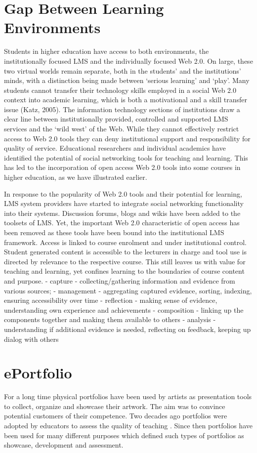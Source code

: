 \section{Gap Between Learning Environments}
Students in higher education have access to both environments, the
institutionally focused LMS and the individually focused Web 2.0. On large,
these two virtual worlds remain separate, both in the students’ and the
institutions’ minds, with a distinction being made between ‘serious learning’
and ‘play’.  Many students cannot transfer their technology skills employed in a
social Web 2.0 context into academic learning, which is both a motivational and
a skill transfer issue (Katz, 2005). The information technology
sections of institutions draw a clear line between institutionally provided, controlled and
supported LMS services and the ‘wild west’ of the Web. While they cannot
effectively restrict access to Web 2.0 tools they can deny institutional support
and responsibility for quality of service. Educational researchers and
individual academics have identified the potential of social networking tools
for teaching and learning. This has led to the incorporation of open access Web
2.0 tools into some courses in higher education, as we have illustrated earlier.

In response to the popularity of Web 2.0 tools and their potential for learning,
LMS system providers have started to integrate social networking functionality
into their systems. Discussion forums, blogs and wikis have been added to the
toolsets of LMS. Yet, the important Web 2.0 characteristic of open access has
been removed as these tools have been bound into the institutional LMS
framework. Access is linked to course enrolment and under institutional control.
Student generated content is accessible to the lecturers in charge and tool use
is directed by relevance to the respective course. This still leaves us with
value for teaching and learning, yet confines learning to the boundaries of
course content and purpose.
 - capture - collecting/gathering information and evidence from various sources;
- management - aggregating captured evidence, sorting, indexing, ensuring accessibility over time
- reflection - making sense of evidence, understanding own experience and achievements
- composition - linking up the components together and making them available to others
- analysis - understanding if additional evidence is needed, reflecting on feedback, keeping up dialog with others
\section{ePortfolio}
For a long time physical portfolios have been used by artists as presentation
tools to collect, organize and showcase their artwork. The aim was to convince
potential customers of their competence. Two decades ago portfolios were adopted
by educators to assess the quality of teaching \citep{VanTartwijkJ.2004}. Since
then portfolios have been used for many different purposes which defined such
types of portfolios as showcase, development and assessment.

